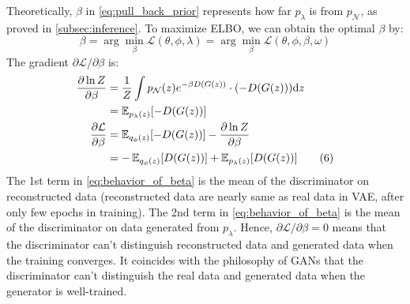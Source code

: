 Theoretically, $\beta$ in \cref{eq:pull_back_prior} represents how far $p_\lambda$ is from $p_\mathcal{N}$, as proved in \cref{subsec:inference}.
To maximize ELBO, we can obtain the optimal $\beta$ by:
\begin{equation}
	\beta = \arg \min_{\beta} \mathcal{L}(\theta, \phi, \lambda) = \arg \min_{\beta} \mathcal{L}(\theta, \phi, \beta, \omega) \tag{5}
\end{equation}
The gradient $\partial \mathcal{L}/\partial \beta$ is:
\begin{align*}\label{eq:behavior_of_beta}
\frac{\partial \ln Z}{\partial \beta} &= \frac{1}{Z} \int p_\mathcal{N}(z) e^{-\beta D(G(z))} \cdot (-D(G(z))) \mathrm{d} z \\
&=  \operatorname{\mathbb{E}}_{p_\lambda(z)} [- D(G(z))]  \\
\frac{\partial \mathcal{L}}{\partial \beta} &= \operatorname{\mathbb{E}}_{q_\phi(z)}[ -D(G(z))] - \frac{\partial \ln Z}{\partial \beta} \\
&= - \operatorname{\mathbb{E}}_{q_\phi(z)}[ D(G(z))] + \operatorname{\mathbb{E}}_{p_\lambda(z)}[ D(G(z))]   \tag{6}
\end{align*}
The 1st term in \cref{eq:behavior_of_beta} is the mean of the discriminator on reconstructed data (reconstructed data are nearly same as real data in VAE, after only few epochs in training). 
The 2nd term in \cref{eq:behavior_of_beta} is the mean of the discriminator on data generated from $p_\lambda$. 
Hence, $\partial \mathcal{L}/\partial \beta = 0$ means that the discriminator can't distinguish reconstructed data and generated data when the training converges. It coincides with the philosophy of GANs that the discriminator can't distinguish the real data and generated data when the generator is well-trained.	

